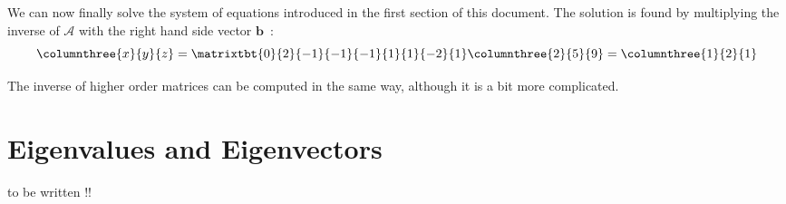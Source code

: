 We can now finally solve the system of equations introduced in the first section of this document.  The solution is
found by multiplying the inverse of $\mathcal{A}$ with the right hand side vector $\mathbf{b}$~:
\[
\columnthree{x}{y}{z}=\matrixtbt{0}{2}{-1}{-1}{-1}{1}{1}{-2}{1}\columnthree{2}{5}{9}=\columnthree{1}{2}{1}
\]

The inverse of higher order matrices can be computed in the same way, although it is a bit more complicated.


\section{Eigenvalues and Eigenvectors}

{\color{red}to be written !!}
















